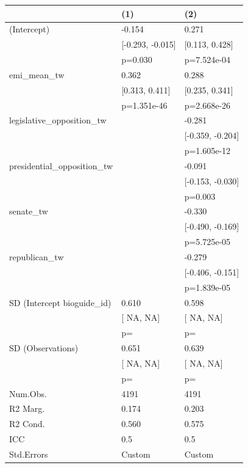 \begin{tabular}{lll}
\hline
& (1) & (2) \\ \hline
(Intercept) & -0.154 & 0.271 \\
& [-0.293, -0.015] & [0.113, 0.428] \\
& p=0.030 & p=7.524e-04 \\
emi_mean_tw & 0.362 & 0.288 \\
& [0.313, 0.411] & [0.235, 0.341] \\
& p=1.351e-46 & p=2.668e-26 \\
legislative_opposition_tw &  & -0.281 \\
&  & [-0.359, -0.204] \\
&  & p=1.605e-12 \\
presidential_opposition_tw &  & -0.091 \\
&  & [-0.153, -0.030] \\
&  & p=0.003 \\
senate_tw &  & -0.330 \\
&  & [-0.490, -0.169] \\
&  & p=5.725e-05 \\
republican_tw &  & -0.279 \\
&  & [-0.406, -0.151] \\
&  & p=1.839e-05 \\
SD (Intercept bioguide_id) & 0.610 & 0.598 \\
& [  NA,   NA] & [  NA,   NA] \\
& p= & p= \\
SD (Observations) & 0.651 & 0.639 \\
& [  NA,   NA] & [  NA,   NA] \\
& p= & p= \\
Num.Obs. & 4191 & 4191 \\
R2 Marg. & 0.174 & 0.203 \\
R2 Cond. & 0.560 & 0.575 \\
ICC & 0.5 & 0.5 \\
Std.Errors & Custom & Custom \\
\hline
\end{tabular}

